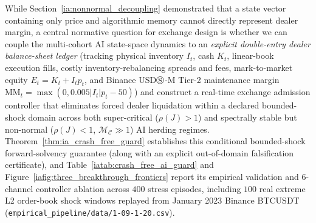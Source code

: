 \documentclass[12pt]{article}
\theoremstyle{definition}
\theoremstyle{remark}
\begin{document}
While Section~\ref{ia:nonnormal_decoupling} demonstrated that a state vector containing only price and algorithmic memory cannot directly represent dealer margin, a central normative question for exchange design is whether we can couple the multi-cohort AI state-space dynamics to an \emph{explicit double-entry dealer balance-sheet ledger} (tracking physical inventory $I_t$, cash $K_t$, linear-book execution fills, costly inventory-rebalancing spreads and fees, mark-to-market equity $E_t = K_t + I_t p_t$, and Binance USD$\circledS$-M Tier-2 maintenance margin $\mathrm{MM}_t = \max(0, 0.005|I_t|p_t - 50)$) and construct a real-time exchange admission controller that eliminates forced dealer liquidation within a declared bounded-shock domain across both super-critical ($\rho(J) > 1$) and spectrally stable but non-normal ($\rho(J) < 1$, $\mathcal{M}_{\mathcal{C}} \gg 1$) AI herding regimes. Theorem~\ref{thm:ia_crash_free_guard} establishes this conditional bounded-shock forward-solvency guarantee (along with an explicit out-of-domain falsification certificate), and Table~\ref{iatab:crash_free_ai_guard} and Figure~\ref{iafig:three_breakthrough_frontiers} report its empirical validation and 6-channel controller ablation across $400$ stress episodes, including $100$ real extreme L2 order-book shock windows replayed from January 2023 Binance BTCUSDT (\texttt{empirical\_pipeline/data/1-09-1-20.csv}).
\end{document}
